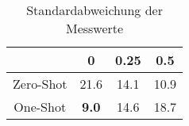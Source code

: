 \bgroup
\def\arraystretch{2}
\begin{table}[H]
	\vspace{.5cm}
	\centering		
	\begin{center}
		\begin{tabular}{|c||c|c|c|}
			\hline 
			& 0 & 0.25 & 0.5 \\
			\hline 
			\hline
			Zero-Shot & 21.6 & 14.1 & 10.9 \\
			\hline
			One-Shot & \textbf{9.0} & 14.6 & 18.7 \\
			\hline
		\end{tabular} 
	\end{center}
	\caption{Standardabweichung der Messwerte}
	\label{fig:o-var}
	\vspace{-.8cm}
\end{table}
\egroup